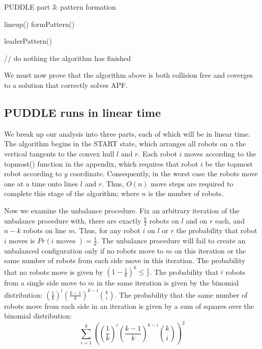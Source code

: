 \documentclass[preprint,10pt]{elsarticle}
\begin{document}
	\clearpage %

	\begin{algorithm}[H]
	\begin{algorithmic}
		\caption{PUDDLE part 3: pattern formation}

			\State
				\State lineup()
				\State formPattern()
			\EndCase

			\State
				\State leaderPattern()
			\EndCase

			\State
				\State // do nothing the algorithm has finished
			\EndCase
		\EndSwitch

	\EndProcedure
	\end{algorithmic}
	\end{algorithm}
	
	We must now prove that the algorithm above is both collision free and coverges to a solution
	that correctly solves APF.
	\subsection{PUDDLE runs in linear time} 
		We break up our analysis into three parts, each of which will be in linear time. The algorithm
		begins in the START state, which arranges all robots on a the vertical tangents to the convex
		hull $l$ and $r$. Each robot $i$ moves according to the topmost() function in the appendix, which requires
		that robot $i$ be the topmost robot according to $y$ coordinate. Consequently, in the worst case 
		the robots move one	at a time onto lines $l$ and $r$. Thus, $O(n)$ move steps are required to 
		complete this stage of the algorithm; where $n$ is the number of robots.

		Now we examine the unbalance procedure. Fix an arbitrary iteration of the unbalance procedure with,
		there are exactly $\frac{k}{2}$ robots on $l$ and on $r$ each, and $n - k$ robots on line $m$. 
		Thus, for any robot $i$ on $l$ or $r$ the probability that robot $i$ moves is 
		$Pr(i \text{ moves }) = \frac{1}{k}$. The unbalance procedure will fail to create an unbalanced configuration
		only if no robots move to $m$ on this iteration or the same number of robots from each side move
		in this iteration. %
		The probability that no robots move is given by $(1 - \frac{1}{k})^{k} \leq \frac{1}{e}$. 
		The probability that $i$ robots from a single side move to $m$ in the same iteration is given 
		by the binomial distribution: $(\frac{1}{k})^i (\frac{k-1}{k})^{k-i} {k\choose i}$.
		The probability that the same number of robots move from each side in an iteration is given 
		by a sum of squares over the binomial distribution:
		$$\sum_{i=1}^{k}{((\frac{1}{k})^i (\frac{k-1}{k})^{k-i} {k\choose i})^2} \label{eq1}$$
\end{document}

